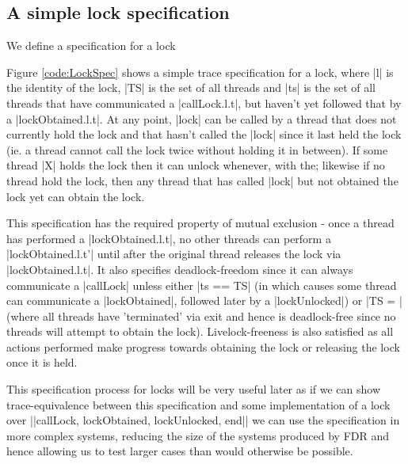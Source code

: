 \subsection{A simple lock specification} 

We define a specification for a lock 

Figure \ref{code:LockSpec} shows a simple trace specification for a lock, where |l| is the identity of the lock, |TS| is the set of all threads and |ts| is the set of all threads that have communicated a |callLock.l.t|, but haven't yet followed that by a |lockObtained.l.t|. At any point, |lock| can be called by a thread that does not currently hold the lock and that hasn't called the |lock| since it last held the lock (ie. a thread cannot call the lock twice without holding it in between). If some thread |X| holds the lock then it can unlock whenever, with the; likewise if no thread hold the lock, then any thread that has called |lock| but not obtained the lock yet can obtain the lock.

This specification has the required property of mutual exclusion - once a thread has performed a |lockObtained.l.t|, no other threads can perform a |lockObtained.l.t'| until after the original thread releases the lock via |lockObtained.l.t|. It also specifies deadlock-freedom since it can always communicate a |callLock| unless either |ts == TS| (in which causes some thread can communicate a |lockObtained|, followed later by a |lockUnlocked|) or |TS = {}| (where all threads have 'terminated' via exit and hence is deadlock-free since no threads will attempt to obtain the lock). Livelock-freeness is also satisfied as all actions performed make progress towards obtaining the lock or releasing the lock once it is held. 

This specification process for locks will be very useful later as if we can show trace-equivalence between this specification and some implementation of a lock over |{|callLock, lockObtained, lockUnlocked, end|}| we can use the specification in more complex systems, reducing the size of the systems produced by FDR and hence allowing us to test larger cases than would otherwise be possible. 

